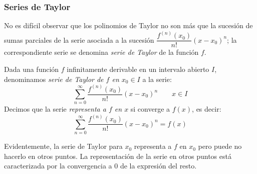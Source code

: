 \subsubsection{Series de Taylor}

No es difícil observar que los polinomios de Taylor no son más que la sucesión de sumas parciales de la serie asociada a la sucesión $\dfrac{f^{(n)}(x_0)}{n!}(x-x_0)^n$; la correspondiente serie se denomina \emph{serie de Taylor} de la función $f$. 
%
\begin{definicion} Dada una función $f$ infinitamente derivable
en un intervalo abierto $I$, denominamos \emph{serie de
Taylor de $f$ en $x_0\in I$} a la serie:
\[
\displaystyle\sum_{n=0}^\infty   \dfrac{f^{(n)}(x_0)}{n!}(x-x_0)^n\qquad x\in I
\]
Decimos que la serie
\emph{representa a $f$ en $x$} si
converge a $f(x)$, es decir:
\[
\displaystyle\sum_{n=0}^\infty   \dfrac{f^{(n)}(x_0)}{n!}(x-x_0)^n=f(x)
\]
\end{definicion}
Evidentemente, la serie de Taylor para $x_0$ representa a
$f$ en $x_0$ pero puede no hacerlo en otros puntos. La representación de la serie en otros puntos está caracterizada por la convergencia a 0 de la expresión del resto.

